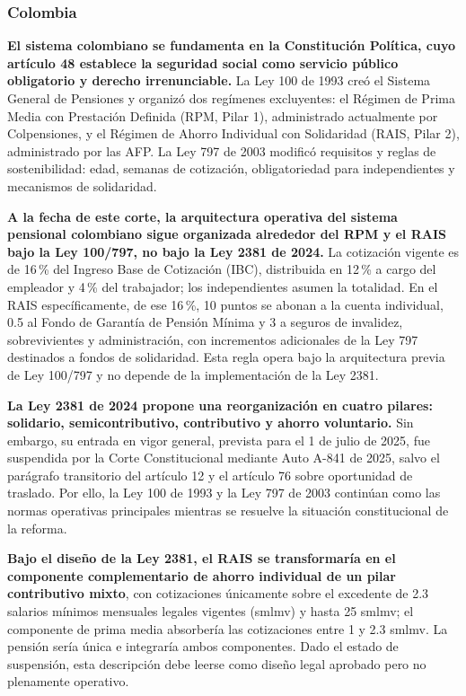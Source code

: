 \documentclass[12pt, letterpaper]{article}
\begin{document}
\subsubsection{Colombia}

\textbf{El sistema colombiano se fundamenta en la Constitución Política, cuyo artículo 48 establece la seguridad social como servicio público obligatorio y derecho irrenunciable.} La Ley 100 de 1993 creó el Sistema General de Pensiones y organizó dos regímenes excluyentes: el Régimen de Prima Media con Prestación Definida (RPM, Pilar 1), administrado actualmente por Colpensiones, y el Régimen de Ahorro Individual con Solidaridad (RAIS, Pilar 2), administrado por las AFP. La Ley 797 de 2003 modificó requisitos y reglas de sostenibilidad: edad, semanas de cotización, obligatoriedad para independientes y mecanismos de solidaridad.

\textbf{A la fecha de este corte, la arquitectura operativa del sistema pensional colombiano sigue organizada alrededor del RPM y el RAIS bajo la Ley 100/797, no bajo la Ley 2381 de 2024.} La cotización vigente es de 16\,\% del Ingreso Base de Cotización (IBC), distribuida en 12\,\% a cargo del empleador y 4\,\% del trabajador; los independientes asumen la totalidad. En el RAIS específicamente, de ese 16\,\%, 10 puntos se abonan a la cuenta individual, 0.5 al Fondo de Garantía de Pensión Mínima y 3 a seguros de invalidez, sobrevivientes y administración, con incrementos adicionales de la Ley 797 destinados a fondos de solidaridad. Esta regla opera bajo la arquitectura previa de Ley 100/797 y no depende de la implementación de la Ley 2381.

\textbf{La Ley 2381 de 2024 propone una reorganización en cuatro pilares: solidario, semicontributivo, contributivo y ahorro voluntario.} Sin embargo, su entrada en vigor general, prevista para el 1 de julio de 2025, fue suspendida por la Corte Constitucional mediante Auto A-841 de 2025, salvo el parágrafo transitorio del artículo 12 y el artículo 76 sobre oportunidad de traslado. Por ello, la Ley 100 de 1993 y la Ley 797 de 2003 continúan como las normas operativas principales mientras se resuelve la situación constitucional de la reforma.

\textbf{Bajo el diseño de la Ley 2381, el RAIS se transformaría en el componente complementario de ahorro individual de un pilar contributivo mixto}, con cotizaciones únicamente sobre el excedente de 2.3 salarios mínimos mensuales legales vigentes (smlmv) y hasta 25 smlmv; el componente de prima media absorbería las cotizaciones entre 1 y 2.3 smlmv. La pensión sería única e integraría ambos componentes. Dado el estado de suspensión, esta descripción debe leerse como diseño legal aprobado pero no plenamente operativo.
\end{document}
